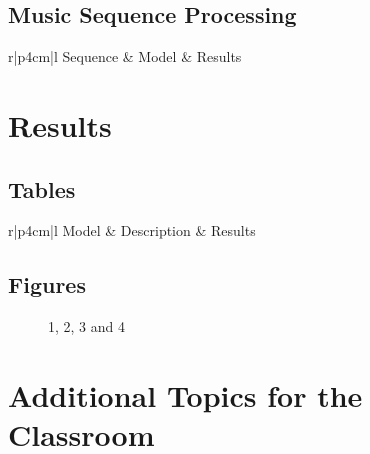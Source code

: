 \subsection{Music Sequence Processing}

\centering	
\begin{table}[H]\tiny
	\caption{}	
	\begin{tabular}{r|p{4cm}|l}
		\hline	
		Sequence & Model & Results \\
		\hline 
		\hline 
	\end{tabular}
\end{table}

\section{Results}


\subsection{Tables}

\centering	
\begin{table}[H]\tiny
	\caption{}	
	\begin{tabular}{r|p{4cm}|l}
		\hline	
		Model & Description & Results \\
		\hline 
		\hline 
	\end{tabular}
\end{table}

\subsection{Figures}

\begin{figure}[H]
	\centering
	\begin{minipage}[b]{0.5\linewidth}
	\end{minipage}\hfill
	\begin{minipage}[b]{0.5\linewidth}
	\end{minipage}\hfill	
	\begin{minipage}[b]{0.5\linewidth}
	\end{minipage}\hfill
	\begin{minipage}[b]{0.5\linewidth}
	\end{minipage}\hfill
	\caption{1, 2, 3 and 4}
	\label{fig:Figure1}
\end{figure} 

\section{Additional Topics for the Classroom}

\begin{enumerate}
\end{enumerate}




\begin{thebibliography}{00}

\end{thebibliography}


